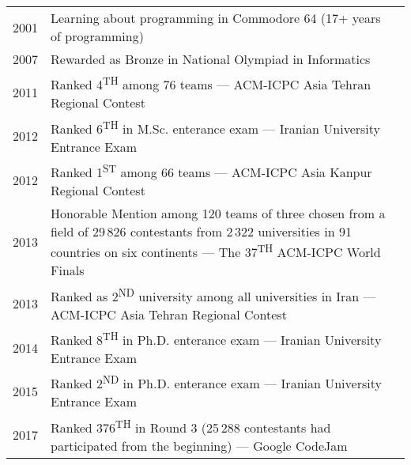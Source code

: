 \documentclass[a4paper,10pt]{article}
\newcommand{\follownote}[1]{--- {\footnotesize\color{darkblue}#1}}
\begin{document}
\begin{tabular}{llN}
2001 & \parbox[t]{11cm}{
	Learning about programming in Commodore 64
	    (17+ years of programming)
} &\\[5mm]

2007 & \parbox[t]{11cm}{
	Rewarded as Bronze in National Olympiad in Informatics
} &\\[5mm]

2011 & \parbox[t]{11cm}{
	Ranked 4\textsuperscript{TH} among 76 teams 
	    \follownote{ACM-ICPC Asia Tehran Regional Contest}
} &\\[5mm]

2012 & \parbox[t]{11cm}{
	Ranked 6\textsuperscript{TH} in M.Sc. enterance exam
	    \follownote{Iranian University Entrance Exam}
} &\\[5mm]

2012 & \parbox[t]{11cm}{
	Ranked 1\textsuperscript{ST} among 66 teams
	    \follownote{ACM-ICPC Asia Kanpur Regional Contest}
} &\\[5mm]

2013 & \parbox[t]{11cm}{
	Honorable Mention among 120 teams of three chosen from a
	    field of 29\,826 contestants from 2\,322 universities in 91
	    countries on six continents
	    \follownote{The 37\textsuperscript{TH} ACM-ICPC World Finals}
} &\\[5mm]

2013 & \parbox[t]{11cm}{
	Ranked as 2\textsuperscript{ND} university among all
	    universities in Iran
	    \follownote{ACM-ICPC Asia Tehran Regional Contest}
} &\\[5mm]

2014 & \parbox[t]{11cm}{
	Ranked 8\textsuperscript{TH} in Ph.D. enterance exam
	    \follownote{Iranian University Entrance Exam}
} &\\[5mm]

2015 & \parbox[t]{11cm}{
	Ranked 2\textsuperscript{ND} in Ph.D. enterance exam
	    \follownote{Iranian University Entrance Exam}
} &\\[5mm]

2017 & \parbox[t]{11cm}{
	Ranked 376\textsuperscript{TH} in Round 3 (25\,288 contestants
	    had participated from the beginning)
	    \follownote{Google CodeJam}
} &\\[5mm]
\end{tabular}
\end{document}
